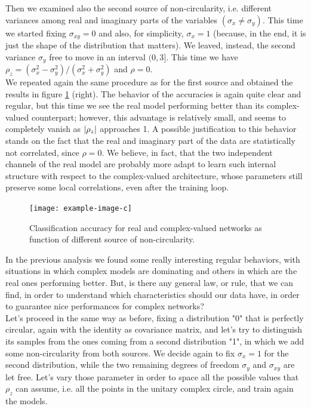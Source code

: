 \documentclass[../main.tex]{subfiles}
\begin{document}
Then we examined also the second source of non-circularity, i.e. different variances among real and imaginary parts of the variables $(\sigma_x\neq\sigma_y)$. This time we started fixing $\sigma_{xy}=0$ and also, for simplicity, $\sigma_x=1$ (because, in the end, it is just the shape of the distribution that matters). We leaved, instead, the second variance $\sigma_y$ free to move in an interval $(0, 3]$. This time we have $\rho_z= (\sigma_x^2-\sigma_y^2)/ (\sigma_x^2+\sigma_y^2)$ and $\rho=0$.\\
We repeated again the same procedure as for the first source and obtained the results in figure \ref{fig:noncirc_results} (right). The behavior of the accuracies is again quite clear and regular, but this time we see the real model performing better than its complex-valued counterpart; however, this advantage is relatively small, and seems to completely vanish as $\abs{\rho_z}$ approaches 1. A possible justification to this behavior stands on the fact that the real and imaginary part of the data are statistically not correlated, since $\rho=0$. We believe, in fact, that the two independent channels of the real model are probably more adapt to learn such internal structure with respect to the complex-valued architecture, whose parameters still preserve some local correlations, even after the training loop.\\
\begin{figure}[!ht]
	\centering
	\texttt{[image: example-image-c]}
	\caption{Classification accuracy for real and complex-valued networks as function of different source of non-circularity.}
	\label{fig:noncirc_results}
\end{figure}
In the previous analysis we found some really interesting regular behaviors, with situations in which complex models are dominating and others in which are the real ones performing better. But, is there any general law, or rule, that we can find, in order to understand which characteristics should our data have, in order to guarantee nice performances for complex networks?\\
Let's proceed in the same way as before, fixing a distribution "0" that is perfectly circular, again with the identity as covariance matrix, and let's try to distinguish its samples from the ones coming from a second distribution "1", in which we add some non-circularity from both sources. We decide again to fix $\sigma_x=1$ for the second distribution, while the two remaining degrees of freedom $\sigma_y$ and $\sigma_{xy}$ are let free. Let's vary those parameter in order to space all the possible values that $\rho_z$ can assume, i.e. all the points in the unitary complex circle, and train again the models.\\
\end{document}
